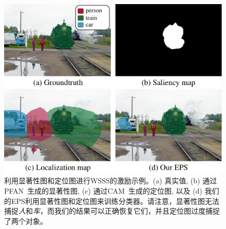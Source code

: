 \begin{figure}[t]
\centering
\includegraphics[width=8 cm]{figures/fig_concept.pdf}
\caption{利用显著性图和定位图进行WSSS的激励示例。(a) 真实值, (b) 通过PFAN~\cite{zhao2019pyramid}生成的显著性图, (c) 通过CAM~\cite{zhou2016learning}生成的定位图, 以及 (d) 我们的EPS利用显著性图和定位图来训练分类器。请注意，显著性图无法捕捉\emph{人}和\emph{车}，而我们的结果可以正确恢复它们，并且定位图过度捕捉了两个对象。} \vspace{-2mm}
\label{fig:concept}
\end{figure}
